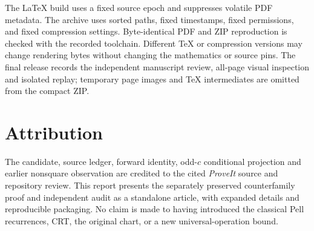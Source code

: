\documentclass[11pt,letterpaper]{article}
\theoremstyle{definition}\newtheorem{definition}[theorem]{Definition}
\theoremstyle{remark}\newtheorem{remark}[theorem]{Remark}
\begin{document}
The LaTeX build uses a fixed source epoch and suppresses volatile PDF
metadata. The archive uses sorted paths, fixed timestamps, fixed
permissions, and fixed compression settings. Byte-identical PDF and ZIP
reproduction is checked with the recorded toolchain. Different TeX or
compression versions may change rendering bytes without changing the
mathematics or source pins. The final release records the independent
manuscript review, all-page visual inspection and isolated replay;
temporary page images and TeX intermediates are omitted from the compact
ZIP.

\clearpage
\section{Attribution}
The candidate, source ledger, forward identity, odd-$c$ conditional
projection and earlier nonsquare observation are credited to the cited
\emph{ProveIt} source and repository review. This report presents the
separately preserved counterfamily proof and independent audit as a
standalone article, with expanded details and reproducible packaging.
No claim is made to having introduced the classical Pell recurrences,
CRT, the original chart, or a new universal-operation bound.
\end{document}
